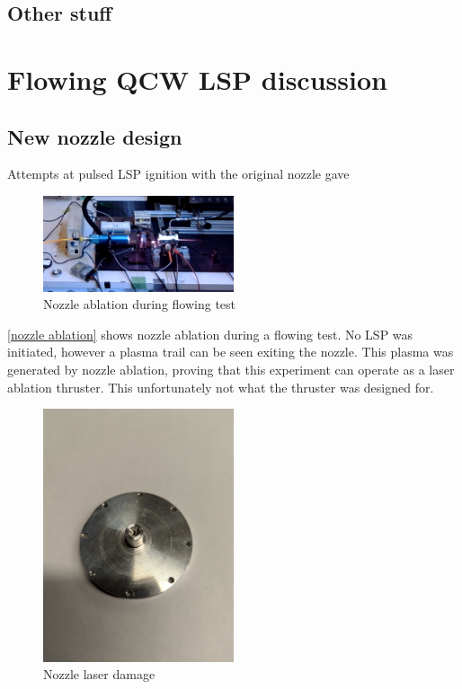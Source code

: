     \subsection*{Other stuff}

\section{Flowing QCW LSP discussion}

    \subsection{New nozzle design}

    Attempts at pulsed LSP ignition with the original nozzle gave 

    \begin{figure}[!ht]
        \centering
        \includegraphics[width=0.5\textwidth]{assets/5 discussion/Nozzle ablation.png}
        \caption{Nozzle ablation during flowing test}
        \label{nozzle ablation}
    \end{figure}

    \autoref{nozzle ablation} shows nozzle ablation during a flowing test. No LSP was initiated, however a plasma trail can be seen exiting the nozzle. This plasma was generated by nozzle ablation, proving that this experiment can operate as a laser ablation thruster. This unfortunately not what the thruster was designed for. 



    \begin{figure}[!ht]
        \centering
        \includegraphics[width=0.5\textwidth]{assets/4 experiments/Nozzle damage.jpg}
        \caption{Nozzle laser damage}
    \end{figure}

